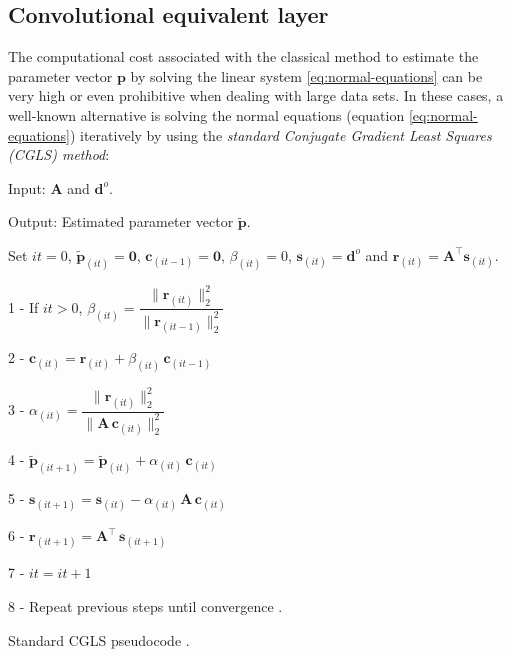 \documentclass[manuscript]{geophysics}
\providecommand{\DIFaddtex}[1]{{\protect\color{blue}\uwave{#1}}} %
\providecommand{\DIFaddbegin}{} %
\providecommand{\DIFaddend}{} %
\providecommand{\DIFadd}[1]{\texorpdfstring{\DIFaddtex{#1}}{#1}} %
\begin{document}
	\subsection{Convolutional equivalent layer}
	
	The computational cost associated with the classical method to estimate the parameter 
	vector $\mathbf{p}$ by solving the linear system \ref{eq:normal-equations} can be very high 
	or even prohibitive when dealing with large data sets. In these cases, a well-known alternative
	is solving the normal equations (equation \ref{eq:normal-equations}) iteratively by 
	using the \textit{standard Conjugate Gradient Least Squares (CGLS) method}:
	
	\begin{algorithm}[H]
		Input: $\mathbf{A}$ and $\mathbf{d}^{o}$.
		
		Output: Estimated parameter vector $\tilde{\mathbf{p}}$.
		
		Set $it = 0$, $\tilde{\mathbf{p}}_{(it)} = \mathbf{0}$, $\mathbf{c}_{(it-1)} = \mathbf{0}$, $\beta_{(it)} = 0$, $\mathbf{s}_{(it)} = \mathbf{d}^{o}$ and $\mathbf{r}_{(it)} = \mathbf{A}^{\top} \mathbf{s}_{(it)}$.
		
		1 - If $it > 0$, $\beta_{(it)} = \dfrac{\| \mathbf{r}_{(it)} \|_{2}^{2}}{\| \mathbf{r}_{(it - 1)} \|_{2}^{2}}$
		
		2 - $\mathbf{c}_{(it)} = \mathbf{r}_{(it)} + \beta_{(it)} \, \mathbf{c}_{(it - 1)}$
		
		3 - $\alpha_{(it)} = \dfrac{{\| \mathbf{r}_{(it)}\|_{2}^{2}}}{\| \mathbf{A} \, \mathbf{c}_{(it)} \|_{2}^{2}}$
		
		4 - $\tilde{\mathbf{p}}_{(it + 1)} = \tilde{\mathbf{p}}_{(it)} + \alpha_{(it)} \, \mathbf{c}_{(it)}$
		
		5 - $\mathbf{s}_{(it + 1)} = \mathbf{s}_{(it)} - \alpha_{(it)} \, \mathbf{A} \, \mathbf{c}_{(it)}$
		
		6 - $\mathbf{r}_{(it + 1)} = \mathbf{A}^{\top} \, \mathbf{s}_{(it + 1)}$
		
		7 - $it = it + 1$
		
		8 - Repeat previous steps until convergence \DIFaddbegin \DIFadd{($\delta$)}\DIFaddend .
		
		\caption{Standard CGLS pseudocode \citep[][ p. 166]{aster2019parameter}.}
		\label{al:std-cgls-algorithm}
	\end{algorithm}
	
\end{document}
